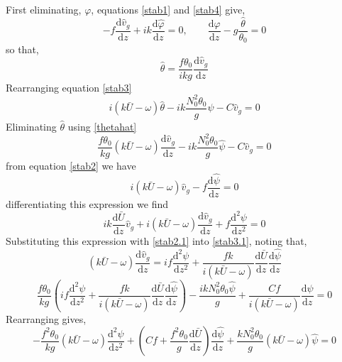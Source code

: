 First eliminating, $\varphi$, equations \ref{stab1} and \ref{stab4} give,
\begin{equation*}
-f\frac{\text{d}\hat{v}_g}{\text{d}z}+ik\frac{\text{d}\hat{\varphi}}{\text{d}z} = 0, \qquad \frac{\text{d}\hat{\varphi}}{\text{d}z} - g\frac{\hat{\theta}}{\theta_0} = 0
\end{equation*}
so that,
\begin{equation}
\hat{\theta} = \frac{f\theta_0}{ikg} \frac{\text{d}\hat{v}_g}{\text{d}z}
\label{thetahat}
\end{equation}
Rearranging equation \ref{stab3}
\begin{equation}
i\left( k \bar{U} - \omega \right) \hat{\theta} - ik\frac{N_0^2\theta_0}{g} \hat{\psi} - C\hat{v}_g = 0
\label{stab3.1}
\end{equation}
Eliminating $\hat{\theta}$ using \ref{thetahat}
\begin{equation*}
\frac{f\theta_0}{kg}\left( k \bar{U} - \omega \right)  \frac{\text{d}\hat{v}_g}{\text{d}z} - ik\frac{N_0^2\theta_0}{g} \hat{\psi} - C\hat{v}_g = 0
\end{equation*}
from equation \ref{stab2} we have
\begin{equation}
i\left( k \bar{U} - \omega \right) \hat{v}_g - f \frac{\text{d}\hat{\psi}}{\text{d}z} = 0
\label{stab2.1}
\end{equation}
differentiating this expression we find
\begin{equation*}
ik \frac{\text{d}\bar{U}}{\text{d}z} \hat{v}_g + i(k\bar{U}-\omega)\frac{\text{d}\hat{v}_g}{\text{d}z} + f\frac{\text{d}^2{\psi}}{\text{d}z^2} = 0 
\end{equation*}
Substituting this expression with \ref{stab2.1} into \ref{stab3.1}, noting that,
\begin{equation*}
(k\bar{U}-\omega)\frac{\text{d}\hat{v}_g}{\text{d}z} = if\frac{\text{d}^2{\psi}}{\text{d}z^2} + \frac{fk}{i(k\bar{U}-\omega)}\frac{\text{d}\bar{U}}{\text{d}z}\frac{\text{d}\hat{\psi}}{\text{d}z}
\end{equation*}
\begin{equation*}
\frac{f\theta_0}{kg}\left(if\frac{\text{d}^2{\psi}}{\text{d}z^2} + \frac{fk}{i(k\bar{U}-\omega)}\frac{\text{d}\bar{U}}{\text{d}z}\frac{\text{d}\hat{\psi}}{\text{d}z}\right) - \frac{ik N_0^2\theta_0\hat{\psi}}{g} + \frac{Cf}{i(k\bar{U}-\omega)}\frac{\text{d}\psi}{\text{d}z} =0
\end{equation*}
Rearranging gives,
\begin{equation*}
-\frac{f^2\theta_0}{kg}(k\bar{U}-\omega)\frac{\text{d}^2{\psi}}{\text{d}z^2}+\left(Cf+\frac{f^2\theta_0}{g}\frac{\text{d}\bar{U}}{\text{d}z}\right)\frac{\text{d}\hat{\psi}}{\text{d}z}+\frac{k N_0^2\theta_0}{g}(k\bar{U}-\omega)\hat{\psi}=0
\end{equation*}
